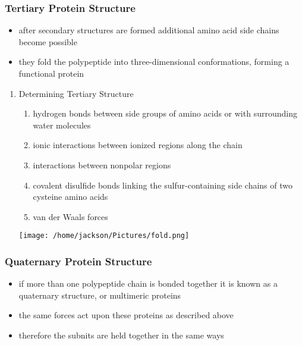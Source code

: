 \documentclass[11pt]{article}
\begin{document}
\subsubsection{Tertiary Protein Structure}
\label{sec:orgb8b6544}
\begin{itemize}
\item after secondary structures are formed additional amino acid side chains become possible
\item they fold the polypeptide into three-dimensional conformations,  forming a functional protein
\end{itemize}
\begin{enumerate}
\item Determining Tertiary Structure
\label{sec:org74a4acc}
\begin{enumerate}
\item hydrogen bonds between side groups of amino acids or with surrounding water molecules
\item ionic interactions between ionized regions along the chain
\item interactions between nonpolar regions
\item covalent disulfide bonds linking the sulfur-containing side chains of two cysteine amino acids
\item van der Waals forces
\end{enumerate}
\begin{center}
\texttt{[image: /home/jackson/Pictures/fold.png]}
\end{center}
\end{enumerate}
\subsubsection{Quaternary Protein Structure}
\label{sec:orgb3aec9a}
\begin{itemize}
\item if more than one polypeptide chain is bonded together it is known as a quaternary structure, or multimeric proteins
\item the same forces act upon these proteins as described above
\item therefore the subnits are held together in the same ways
\end{itemize}
\end{document}
